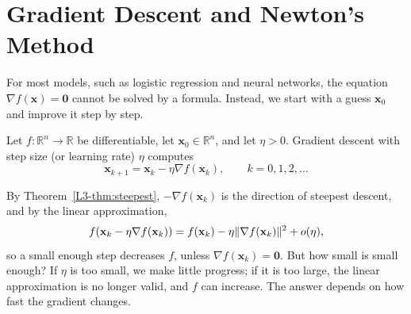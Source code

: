 \section{Gradient Descent and Newton's Method}\label{L3-sec:gd}

For most models, such as logistic regression and neural networks, the equation $\nabla f(\mathbf{x}) = \mathbf{0}$ cannot be solved by a formula. Instead, we start with a guess $\mathbf{x}_0$ and improve it step by step.

\begin{definition}\label{L3-def:gd}
    Let $f: \mathbb{R}^n \to \mathbb{R}$ be differentiable, let $\mathbf{x}_0 \in \mathbb{R}^n$, and let $\eta > 0$. Gradient descent with step size (or learning rate) $\eta$ computes
    \[\mathbf{x}_{k+1} = \mathbf{x}_k - \eta \nabla f(\mathbf{x}_k), \qquad k = 0, 1, 2, \ldots\]
\end{definition}

By Theorem~\ref{L3-thm:steepest}, $-\nabla f(\mathbf{x}_k)$ is the direction of steepest descent, and by the linear approximation,
\[f(\mathbf{x}_k - \eta\nabla f(\mathbf{x}_k)) = f(\mathbf{x}_k) - \eta\lVert \nabla f(\mathbf{x}_k) \rVert^2 + o(\eta),\]
so a small enough step decreases $f$, unless $\nabla f(\mathbf{x}_k) = \mathbf{0}$. But how small is small enough? If $\eta$ is too small, we make little progress; if it is too large, the linear approximation is no longer valid, and $f$ can increase. The answer depends on how fast the gradient changes.

